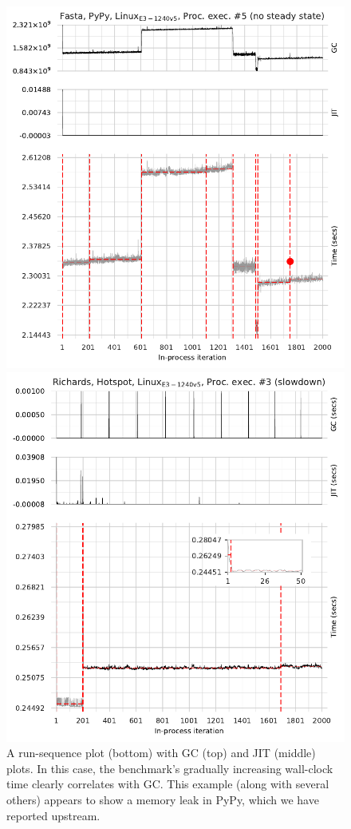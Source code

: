 \documentclass[acmsmall]{acmart}\settopmatter{printfolios=true}
\begin{document}
\begin{figure}[!tbp]
\centering
\begin{minipage}[t]{0.485\textwidth}
\includegraphics[width=\textwidth]{examples/new_good_comp.pdf}
\caption{A run-sequence plot (bottom) with GC (top) and JIT (middle) plots.
In this case, the benchmark's gradually increasing wall-clock time clearly
correlates with GC. This example (along with several others) appears to show a
memory leak in PyPy, which we have reported upstream.}
\label{fig:goodcomp}
\end{minipage}
\hfill
\begin{minipage}[t]{0.485\textwidth}
\includegraphics[width=\textwidth]{examples/new_miscomp.pdf}

\end{minipage}
\end{figure}
\end{document}
